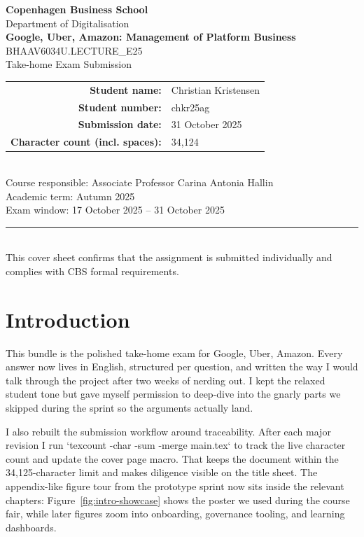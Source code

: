 \documentclass[12pt,a4paper]{article}
\newcommand{\university}{Copenhagen Business School}
\newcommand{\faculty}{Department of Digitalisation}
\newcommand{\examTitle}{Google, Uber, Amazon: Management of Platform Business}
\newcommand{\examCode}{BHAAV6034U.LECTURE\_E25}
\newcommand{\examType}{Take-home Exam Submission}
\newcommand{\studentName}{Christian Kristensen}
\newcommand{\studentId}{chkr25ag}
\newcommand{\submissionDate}{31 October 2025}
\newcommand{\wordCount}{34,124}
\begin{document}
\begin{titlepage}
  \thispagestyle{empty}
  \centering
  {\Large \textbf{\university}}\\[0.5cm]
  {\large \faculty}\\[1.5cm]
  {\LARGE \textbf{\examTitle}}\\[0.5cm]
  {\large \examCode\\\examType}\\[1.5cm]
  \begin{tabular}{rl}
    \textbf{Student name:} & \studentName \\
    \textbf{Student number:} & \studentId \\
    \textbf{Submission date:} & \submissionDate \\
    \textbf{Character count (incl. spaces):} & \wordCount \\
  \end{tabular}\\[1.5cm]
  \vfill
  {\large Course responsible: Associate Professor Carina Antonia Hallin}\\[0.3cm]
  {\large Academic term: Autumn 2025}\\[0.3cm]
  {\large Exam window: 17 October 2025 -- 31 October 2025}\\[1.5cm]
  \rule{0.8\linewidth}{0.4pt}\\[0.5cm]
  {\small This cover sheet confirms that the assignment is submitted individually and complies with CBS formal requirements.}
\end{titlepage}

\setcounter{secnumdepth}{-1}
\makeatletter
\renewcommand{\numberline}[1]{}
\makeatother

\tableofcontents
\newpage

\section*{Introduction}
This bundle is the polished take-home exam for Google, Uber, Amazon. Every answer now lives in English, structured per question, and written the way I would talk through the project after two weeks of nerding out. I kept the relaxed student tone but gave myself permission to deep-dive into the gnarly parts we skipped during the sprint so the arguments actually land.

I also rebuilt the submission workflow around traceability. After each major revision I run `texcount -char -sum -merge main.tex` to track the live character count and update the cover page macro. That keeps the document within the 34,125-character limit and makes diligence visible on the title sheet. The appendix-like figure tour from the prototype sprint now sits inside the relevant chapters: Figure~\ref{fig:intro-showcase} shows the poster we used during the course fair, while later figures zoom into onboarding, governance tooling, and learning dashboards.
\end{document}
